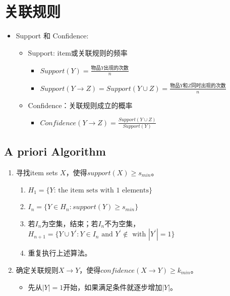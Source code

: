 \documentclass[12pt, a4paper, oneside]{ctexart}
\begin{document}
\section{关联规则}
\begin{itemize}
    \item Support 和 Confidence:
    
    \begin{itemize}
        \item Support: item或关联规则的频率
        \begin{itemize}
            \item $Support(Y)=\frac{\text{物品}Y\text{出现的次数}}{n}$
            \item $Support(Y\rightarrow Z)=Support(Y\cup Z)=\frac{\text{物品}Y\text{和}Z\text{同时出现的次数}}{n}$
        \end{itemize}
        \item Confidence：关联规则成立的概率
        \begin{itemize}
            \item $Confidence(Y\rightarrow Z)=\frac{Support(Y\cup Z)}{Support(Y)}$
        \end{itemize}
    \end{itemize}
\end{itemize}
\subsection{A priori Algorithm}
\begin{enumerate}
    \item 寻找item sets $X$，使得$support(X)\geqslant s_{min}$。
    \begin{enumerate}
        \item $H_1=\{Y\text{: the item sets with 1 elements}\}$
        \item $I_n=\{Y \in H_n: support(Y)\geqslant s_{min}\}$
        \item 若$I_n$为空集，结束；若$I_n$不为空集，$H_{n+1}=\{Y\cup Y^\prime: Y \in I_n \text{ and } Y^\prime \notin \text{ with }|Y^\prime|=1\}$
        \item 重复执行上述算法。
    \end{enumerate}
    \item 确定关联规则$X\rightarrow Y$，使得$confidence(X\rightarrow Y)\geqslant k_{min}$。
    \begin{itemize}
        \item 先从$|Y|=1$开始，如果满足条件就逐步增加$|Y|$。
    \end{itemize}
\end{enumerate}
\end{document}

